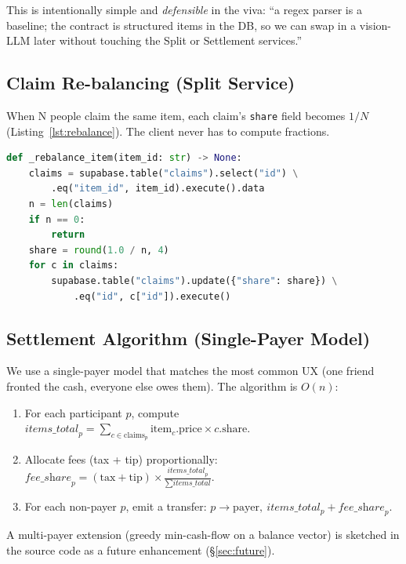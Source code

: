 \documentclass[11pt, a4paper]{article}
\begin{document}
This is intentionally simple and \textit{defensible} in the viva: ``a regex parser is a baseline; the contract is structured items in the DB, so we can swap in a vision-LLM later without touching the Split or Settlement services.''

\subsection{Claim Re-balancing (Split Service)}

When N people claim the same item, each claim's \texttt{share} field becomes $1/N$ (Listing~\ref{lst:rebalance}). The client never has to compute fractions.

\begin{lstlisting}[language=Python, caption={Item re-balancing.}, label={lst:rebalance}]
def _rebalance_item(item_id: str) -> None:
    claims = supabase.table("claims").select("id") \
        .eq("item_id", item_id).execute().data
    n = len(claims)
    if n == 0:
        return
    share = round(1.0 / n, 4)
    for c in claims:
        supabase.table("claims").update({"share": share}) \
            .eq("id", c["id"]).execute()
\end{lstlisting}

\subsection{Settlement Algorithm (Single-Payer Model)}

We use a single-payer model that matches the most common UX (one friend fronted the cash, everyone else owes them). The algorithm is $O(n)$:

\begin{enumerate}[leftmargin=*]
\item For each participant $p$, compute
  $\textit{items\_total}_p = \sum_{c \in \text{claims}_p} \text{item}_c.\text{price} \times c.\text{share}$.
\item Allocate fees (tax + tip) proportionally:
  $\textit{fee\_share}_p = (\text{tax} + \text{tip}) \times \frac{\textit{items\_total}_p}{\sum \textit{items\_total}}$.
\item For each non-payer $p$, emit a transfer:
  $p \rightarrow \text{payer},\ \textit{items\_total}_p + \textit{fee\_share}_p$.
\end{enumerate}

A multi-payer extension (greedy min-cash-flow on a balance vector) is sketched in the source code as a future enhancement (\S\ref{sec:future}).
\end{document}
